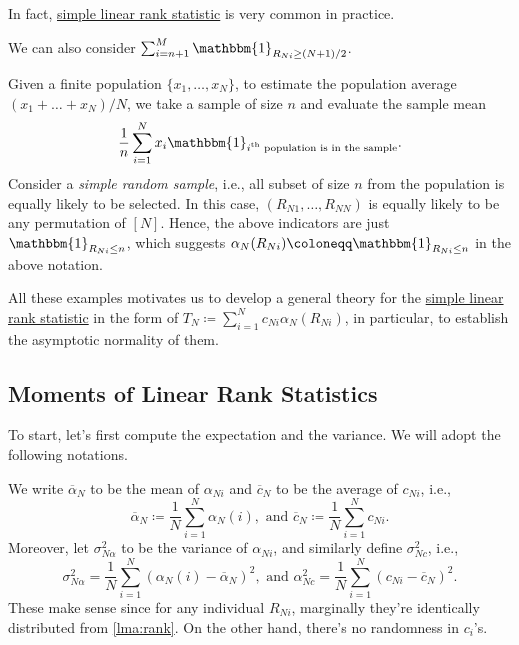 In fact, \hyperref[def:simple-linrea-rank-statistic]{simple linear rank statistic} is very common in practice.

\begin{eg}
	We can also consider \(\sum_{i=n+1}^{M} \mathbbm{1}_{R_{Ni} \geq (N+1) / 2}\).
\end{eg}

\begin{eg}
	Given a finite population \(\{ x_1, \dots , x_N \} \), to estimate the population average \((x_1 + \dots + x_N) / N\), we take a sample of size \(n\) and evaluate the sample mean
	\[
		\frac{1}{n} \sum_{i=1}^{N} x_i \mathbbm{1}_{\text{\(i^{\text{th} }\) population is in the sample} } .
	\]
	Consider a \emph{simple random sample}, i.e., all subset of size \(n\) from the population is equally likely to be selected. In this case, \((R_{N1}, \dots , R_{NN})\) is equally likely to be any permutation of \([N]\). Hence, the above indicators are just \(\mathbbm{1}_{R_{Ni} \leq n} \), which suggests \(\alpha _N(R_{Ni}) \coloneqq \mathbbm{1}_{R_{Ni} \leq n} \) in the above notation.
\end{eg}

All these examples motivates us to develop a general theory for the \hyperref[def:simple-linrea-rank-statistic]{simple linear rank statistic} in the form of \(T_N \coloneqq \sum_{i=1}^{N} c_{Ni} \alpha _N(R_{Ni})\), in particular, to establish the asymptotic normality of them.

\subsection{Moments of Linear Rank Statistics}
To start, let's first compute the expectation and the variance. We will adopt the following notations.

\begin{notation}
	We write \(\overline{\alpha} _N\) to be the mean of \(\alpha _{Ni}\) and \(\overline{c} _N\) to be the average of \(c_{Ni}\), i.e.,
	\[
		\overline{\alpha} _N \coloneqq \frac{1}{N} \sum_{i=1}^{N} \alpha _N(i), \text{ and }
		\overline{c} _N \coloneqq \frac{1}{N} \sum_{i=1}^{N} c_{Ni}.
	\]
	Moreover, let \(\sigma _{N \alpha }^2\) to be the variance of \(\alpha _{Ni}\), and similarly define \(\sigma _{Nc}^2\), i.e.,
	\[
		\sigma _{N \alpha }^2 = \frac{1}{N} \sum_{i=1}^{N} (\alpha _N(i) - \overline{\alpha} _N)^2, \text{ and }
		\alpha _{N c}^2 = \frac{1}{N} \sum_{i=1}^{N} (c_{Ni} - \overline{c} _N)^2.
	\]
	These make sense since for any individual \(R_{Ni}\), marginally they're identically distributed from \autoref{lma:rank}. On the other hand, there's no randomness in \(c_i\)'s.
\end{notation}

